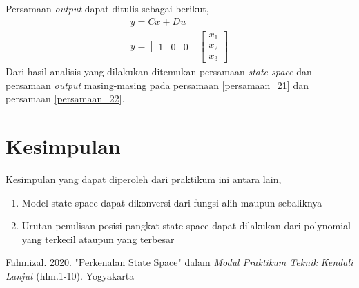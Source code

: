 \documentclass[../cover.tex]{subfiles}
\begin{document}
        Persamaan \textit{output} dapat ditulis sebagai berikut,
        \begin{equation}
            \begin{split}
                y = Cx + Du \\[5pt]
                y = \begin{bmatrix} 1 & 0 & 0 \end{bmatrix} \begin{bmatrix} x_1 \\ x_2 \\ x_3 \end{bmatrix}
            \end{split}
            \label{persamaan_22}
        \end{equation}
        Dari hasil analisis yang dilakukan ditemukan persamaan \textit{state-space} dan persamaan \textit{output} masing-masing pada persamaan \eqref{persamaan_21} dan persamaan \eqref{persamaan_22}.
\section{Kesimpulan}
    Kesimpulan yang dapat diperoleh dari praktikum ini antara lain,
    \begin{enumerate}
        \item Model state space dapat dikonversi dari fungsi alih maupun sebaliknya
        \item Urutan penulisan posisi pangkat state space dapat dilakukan dari polynomial yang terkecil ataupun yang terbesar
    \end{enumerate}
\begin{thebibliography}{2}
     Fahmizal. 2020. "Perkenalan State Space" dalam \textit{Modul Praktikum Teknik Kendali Lanjut} (hlm.1-10). Yogyakarta
\end{thebibliography}
    
\end{document}
